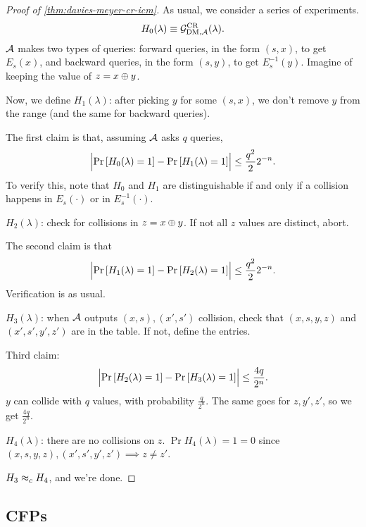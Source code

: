 \begin{proof}[Proof of \cref{thm:davies-meyer-cr-icm}]
	As usual, we consider a series of experiments.
	\begin{equation*}
		H_0(\lambda) \equiv \mathcal{G}^{\scriptstyle \text{CR}}_{{\scriptstyle \text{DM}}, \mathcal{A}}(\lambda).
	\end{equation*}
	$\mathcal{A}$ makes two types of queries: forward queries, in the form $(s,x)$, to get $E_s(x)$, and backward queries, in the form $(s,y)$, to get $E^{-1}_s(y)$.
	Imagine of keeping the value of $z = x \oplus y$.

	Now, we define $H_1(\lambda)$: after picking $y$ for some $(s,x)$, we don't remove $y$ from the range (and the same for backward queries).

	The first claim is that, assuming $\mathcal{A}$ asks $q$ queries,
	\begin{equation*}
		\left|{\mathop{\mathrm{Pr}}\limits_{} \left[ {H_0(\lambda) = 1} \right] - \mathop{\mathrm{Pr}}\limits_{} \left[ {H_1(\lambda) = 1} \right]}\right| \le \frac{q^2}{2} 2^{-n}.
	\end{equation*}
	To verify this, note that $H_0$ and $H_1$ are distinguishable if and only if a collision happens in $E_s(\cdot)$ or in $E^{-1}_s(\cdot)$.

	$H_2(\lambda)$: check for collisions in $z = x \oplus y$.
	If not all $z$ values are distinct, abort.

	The second claim is that
	\begin{equation*}
		\left|{\mathop{\mathrm{Pr}}\limits_{} \left[ {H_1(\lambda) = 1} \right] - \mathop{\mathrm{Pr}}\limits_{} \left[ {H_2(\lambda) = 1} \right]}\right| \le \frac{q^2}{2} 2^{-n}.
	\end{equation*}
	Verification is as usual.

	$H_3(\lambda)$: when $\mathcal{A}$ outputs $(x,s), (x',s')$ collision, check that $(x,s,y,z)$ and $(x',s',y',z')$ are in the table.
	If not, define the entries.

	Third claim:
	\begin{equation*}
		\left|{\mathop{\mathrm{Pr}}\limits_{} \left[ {H_2(\lambda) = 1} \right] - \mathop{\mathrm{Pr}}\limits_{} \left[ {H_3(\lambda) = 1} \right]}\right| \le \frac{4 q}{2^n}.
	\end{equation*}
	$y$ can collide with $q$ values, with probability $\frac{q}{2^n}$.
	The same goes for $z, y', z'$, so we get $\frac{4 q}{2^n}$.

	$H_4(\lambda)$: there are no collisions on $z$.
	$\Pr{H_4(\lambda) = 1} = 0$ since $(x,s,y,z), (x',s',y',z') \implies z \neq z'$.

	$H_3 \approx_c H_4$, and we're done.
\end{proof}

\subsection{\aclp{CFP}}

